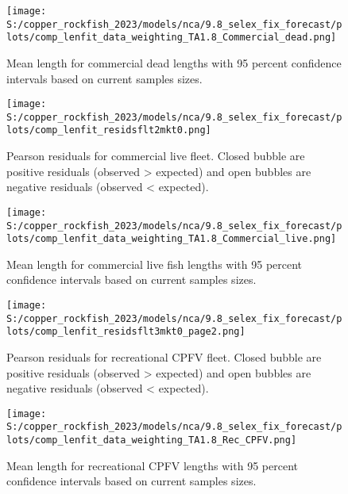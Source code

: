 \documentclass[11pt,
  english,
  letterpaper,
]{article}
\begin{document}
\pagebreak

\begin{figure}
\centering
\texttt{[image: S:/copper\_rockfish\_2023/models/nca/9.8\_selex\_fix\_forecast/plots/comp\_lenfit\_data\_weighting\_TA1.8\_Commercial\_dead.png]}
\caption{Mean length for commercial dead lengths with 95 percent confidence intervals based on current samples sizes.\label{fig:com-dead-mean-len-fit}}
\end{figure}

\pagebreak

\pagebreak

\begin{figure}
\centering
\texttt{[image: S:/copper\_rockfish\_2023/models/nca/9.8\_selex\_fix\_forecast/plots/comp\_lenfit\_residsflt2mkt0.png]}
\caption{Pearson residuals for commercial live fleet. Closed bubble are positive residuals (observed \textgreater{} expected) and open bubbles are negative residuals (observed \textless{} expected).\label{fig:com-live-pearson}}
\end{figure}

\pagebreak

\begin{figure}
\centering
\texttt{[image: S:/copper\_rockfish\_2023/models/nca/9.8\_selex\_fix\_forecast/plots/comp\_lenfit\_data\_weighting\_TA1.8\_Commercial\_live.png]}
\caption{Mean length for commercial live fish lengths with 95 percent confidence intervals based on current samples sizes.\label{fig:com-live-mean-len-fit}}
\end{figure}

\pagebreak

\begin{figure}
\centering
\texttt{[image: S:/copper\_rockfish\_2023/models/nca/9.8\_selex\_fix\_forecast/plots/comp\_lenfit\_residsflt3mkt0\_page2.png]}
\caption{Pearson residuals for recreational CPFV fleet. Closed bubble are positive residuals (observed \textgreater{} expected) and open bubbles are negative residuals (observed \textless{} expected).\label{fig:rec-cpfv-pearson}}
\end{figure}

\pagebreak

\begin{figure}
\centering
\texttt{[image: S:/copper\_rockfish\_2023/models/nca/9.8\_selex\_fix\_forecast/plots/comp\_lenfit\_data\_weighting\_TA1.8\_Rec\_CPFV.png]}
\caption{Mean length for recreational CPFV lengths with 95 percent confidence intervals based on current samples sizes.\label{fig:rec-cpfv-mean-len-fit}}
\end{figure}
\end{document}

